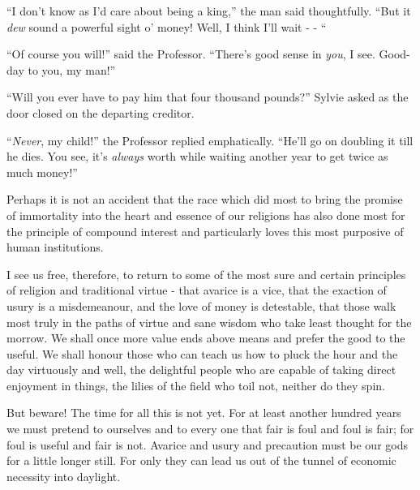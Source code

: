 \begin{rquote}
“I don’t know as I’d care about being a king,” the man said thoughtfully. “But it \textit{dew} sound a powerful sight o’ money! Well, I think I’ll wait - - “
\end{rquote}

\begin{rquote}
“Of course you will!” said the Professor. “There’s good sense in \textit{you}, I see. Good-day to you, my man!”
\end{rquote}

\begin{rquote}
“Will you ever have to pay him that four thousand pounds?” Sylvie asked as the door closed on the departing creditor.
\end{rquote}

\begin{rquote}
“\textit{Never}, my child!” the Professor replied emphatically. “He’ll go on doubling it till he dies. You see, it’s \textit{always} worth while waiting another year to get twice as much money!”
\end{rquote}

Perhaps it is not an accident that the race which did most to bring the promise of immortality into the heart and essence of our religions has also done most for the principle of compound interest and particularly loves this most purposive of human institutions.\par

I see us free, therefore, to return to some of the most sure and certain principles of religion and traditional virtue - that avarice is a vice, that the exaction of usury is a misdemeanour, and the love of money is detestable, that those walk most truly in the paths of virtue and sane wisdom who take least thought for the morrow. We shall once more value ends above means and prefer the good to the useful. We shall honour those who can teach us how to pluck the hour and the day virtuously and well, the delightful people who are capable of taking direct enjoyment in things, the lilies of the field who toil not, neither do they spin.\par

But beware! The time for all this is not yet. For at least another hundred years we must pretend to ourselves and to every one that fair is foul and foul is fair; for foul is useful and fair is not. Avarice and usury and precaution must be our gods for a little longer still. For only they can lead us out of the tunnel of economic necessity into daylight.\par

